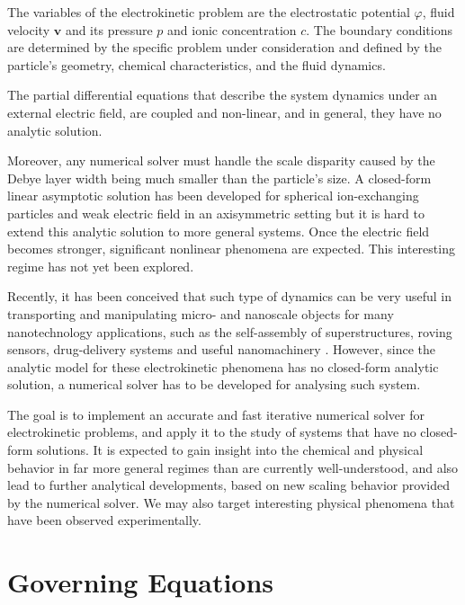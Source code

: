 \documentclass[final]{elsarticle}
\newcommand\bv{\boldsymbol{v}}
\begin{document}
The variables of the electrokinetic problem are the electrostatic
potential $\varphi$, fluid velocity $\bv$ and its pressure $p$ and
ionic concentration $c$.
The boundary conditions are determined by the specific
problem under consideration and defined by the particle's
geometry, chemical characteristics, and the fluid dynamics.

The partial differential equations that describe the system dynamics
under an external electric field, are coupled and non-linear, and
in general, they have no analytic solution. 

Moreover, any numerical solver must handle the scale disparity caused by the
Debye layer width being much smaller than the particle's size. A
closed-form linear asymptotic solution has been developed for
spherical ion-exchanging particles and weak electric field in an
axisymmetric setting \cite{yariv2010migration} but it is hard to extend this
analytic solution to more general systems. Once the electric field
becomes stronger, significant nonlinear phenomena are expected.
This interesting regime has not yet been explored.

Recently, it has been conceived that such type of dynamics
can be very useful in transporting and manipulating micro-
and nanoscale objects for many nanotechnology applications,
such as the self-assembly of superstructures, roving sensors, 
drug-delivery systems and useful nanomachinery 
\cite{howse2007self,paxton2004catalytic,pumera2010electrochemically}.
However, since the analytic model for these electrokinetic
phenomena has no closed-form analytic solution, a numerical
solver has to be developed for analysing such system.

The goal is to implement an accurate and fast iterative numerical
solver for electrokinetic problems, and apply it to the study
of systems that have no closed-form solutions.
It is expected to gain insight into the chemical and physical behavior 
in far more general regimes than are currently well-understood, 
and also lead to further analytical developments, based on new scaling behavior
provided by the numerical solver. We may also target interesting physical
phenomena that have been observed experimentally.


\section{Governing Equations} \label{sec:equations}
\end{document}
